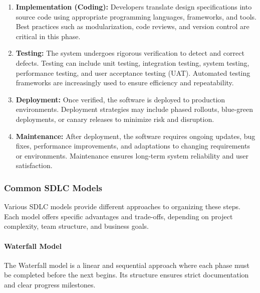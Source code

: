 \begin{spacing}{1.2}
\begin{enumerate}
    \item \textbf{Implementation (Coding):} Developers translate design specifications into source code using appropriate programming languages, frameworks, and tools. Best practices such as modularization, code reviews, and version control are critical in this phase.
    
    \item \textbf{Testing:} The system undergoes rigorous verification to detect and correct defects. Testing can include unit testing, integration testing, system testing, performance testing, and user acceptance testing (UAT). Automated testing frameworks are increasingly used to ensure efficiency and repeatability.
    
    \item \textbf{Deployment:} Once verified, the software is deployed to production environments. Deployment strategies may include phased rollouts, blue-green deployments, or canary releases to minimize risk and disruption.
    
    \item \textbf{Maintenance:} After deployment, the software requires ongoing updates, bug fixes, performance improvements, and adaptations to changing requirements or environments. Maintenance ensures long-term system reliability and user satisfaction.
\end{enumerate}

\subsubsection*{Common SDLC Models}
Various SDLC models provide different approaches to organizing these steps. Each model offers specific advantages and trade-offs, depending on project complexity, team structure, and business goals.

\paragraph{Waterfall Model}
The Waterfall model is a linear and sequential approach where each phase must be completed before the next begins. Its structure ensures strict documentation and clear progress milestones.  


\end{spacing}
